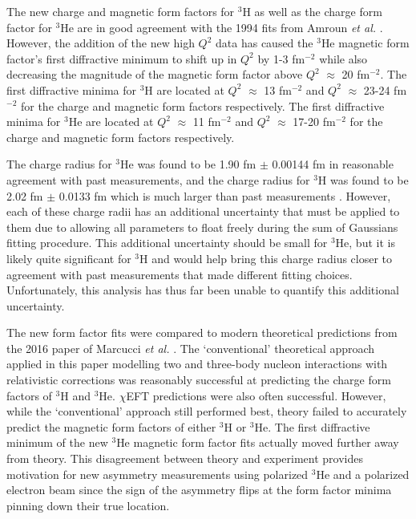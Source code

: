\documentclass[../main.tex]{subfiles}
\begin{document}
\begin{singlespace}
{{}

{\parindent0pt %

\indent The new charge and magnetic form factors for $^3$H as well as the charge form factor for $^3$He are in good agreement with the 1994 fits from Amroun \textit{et al.} \cite{Article:Amroun}. However, the addition of the new high $Q^2$ data has caused the $^3$He magnetic form factor's first diffractive minimum to shift up in $Q^2$ by 1-3 fm$^{-2}$ while also decreasing the magnitude of the magnetic form factor above $Q^2$ $\approx$ 20 fm$^{-2}$. The first diffractive minima for $^3$H are located at $Q^2$ $\approx$ 13 fm$^{-2}$ and $Q^2$ $\approx$ 23-24 fm$^{-2}$ for the charge and magnetic form factors respectively. The first diffractive minima for $^3$He are located at $Q^2$ $\approx$ 11 fm$^{-2}$ and $Q^2$ $\approx$ 17-20 fm$^{-2}$ for the charge and magnetic form factors respectively. \\

}

{\parindent0pt %

\indent The charge radius for $^3$He was found to be 1.90 fm $\pm$ 0.00144 fm in reasonable agreement with past measurements, and the charge radius for $^3$H was found to be 2.02 fm $\pm$ 0.0133 fm which is much larger than past measurements \cite{3h_proposal}. However, each of these charge radii has an additional uncertainty that must be applied to them due to allowing all parameters to float freely during the sum of Gaussians fitting procedure. This additional uncertainty should be small for $^3$He, but it is likely quite significant for $^3$H and would help bring this charge radius closer to agreement with past measurements that made different fitting choices. Unfortunately, this analysis has thus far been unable to quantify this additional uncertainty. \\

}

{\parindent0pt %

\indent The new form factor fits were compared to modern theoretical predictions from the 2016 paper of Marcucci \textit{et al.} \cite{Article:Marcucci}. The `conventional' theoretical approach applied in this paper modelling two and three-body nucleon interactions with relativistic corrections was reasonably successful at predicting the charge form factors of $^3$H and $^3$He. $\chi$EFT predictions were also often successful. However, while the `conventional' approach still performed best, theory failed to accurately predict the magnetic form factors of either $^3$H or $^3$He. The first diffractive minimum of the new $^3$He magnetic form factor fits actually moved further away from theory. This disagreement between theory and experiment provides motivation for new asymmetry measurements using polarized $^3$He and a polarized electron beam since the sign of the asymmetry flips at the form factor minima pinning down their true location.

}

}
\end{singlespace}
\end{document}
